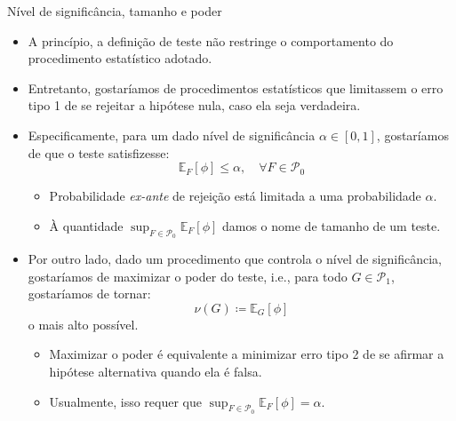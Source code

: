 \documentclass[11pt]{beamer}
\begin{document}
\begin{frame}{Nível de significância, tamanho e poder }
\begin{itemize}
	\item A princípio, a definição de teste não restringe o comportamento do procedimento estatístico adotado.
	\item Entretanto, gostaríamos de procedimentos estatísticos que limitassem o {\color{blue}erro tipo 1} de se rejeitar a hipótese nula, caso ela seja verdadeira.
	\item Especificamente, para um dado {\color{blue}nível de significância} $\alpha \in [0,1]$, gostaríamos de que o teste satisfizesse:
	$$\mathbb{E}_F[\phi] \leq \alpha,\quad \forall F \in \mathcal{P}_0$$
	\vspace{-1em}
	\begin{itemize}
		\item Probabilidade \textit{ex-ante} de rejeição está limitada a uma probabilidade $\alpha$.
		\item À quantidade $\sup_{F \in \mathcal{P}_0} \mathbb{E}_F[\phi]$ damos o nome de {\color{blue}tamanho} de um teste.
	\end{itemize}
	\item Por outro lado, dado um procedimento que controla o nível de significância, gostaríamos de maximizar {\color{blue}o poder do teste}, i.e., para todo $G \in \mathcal{P}_1$, gostaríamos de tornar:
	$$\nu(G)\coloneqq \mathbb{E}_G[\phi]$$
	o mais alto possível.
	\begin{itemize}
		\item Maximizar o poder é equivalente a minimizar {\color{blue}erro tipo 2} de se afirmar a hipótese alternativa quando ela é falsa.
		\item Usualmente, isso requer que $\sup_{F \in \mathcal{P}_0} \mathbb{E}_F[\phi] = \alpha$.
	\end{itemize}
\end{itemize}
\end{frame}
\end{document}

